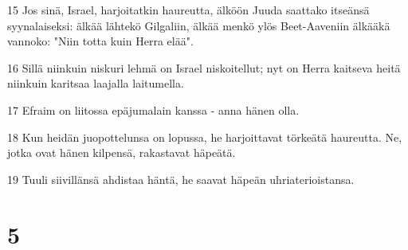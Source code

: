 \par 15 Jos sinä, Israel, harjoitatkin haureutta, älköön Juuda saattako itseänsä syynalaiseksi: älkää lähtekö Gilgaliin, älkää menkö ylös Beet-Aaveniin älkääkä vannoko: "Niin totta kuin Herra elää".
\par 16 Sillä niinkuin niskuri lehmä on Israel niskoitellut; nyt on Herra kaitseva heitä niinkuin karitsaa laajalla laitumella.
\par 17 Efraim on liitossa epäjumalain kanssa - anna hänen olla.
\par 18 Kun heidän juopottelunsa on lopussa, he harjoittavat törkeätä haureutta. Ne, jotka ovat hänen kilpensä, rakastavat häpeätä.
\par 19 Tuuli siivillänsä ahdistaa häntä, he saavat häpeän uhriaterioistansa.

\chapter{5}

